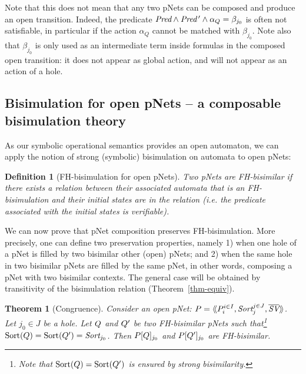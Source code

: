 \documentclass{lmcs}
\newcommand{\TODO}[1]{\textcolor{red}{\textbf{[TODO:#1]}}}
\newtheorem{theorem}{Theorem}
\newtheorem{definition}{Definition}
\begin{document}
Note that this does not mean that any two pNets can be composed and produce an open 
transition. Indeed, the predicate $\Pred\land\Pred\,'\land \alpha_Q=\beta_{j_0}$ is often not  satisfiable, in particular if the action  $\alpha_Q$ cannot be matched with $\beta_{j_0}$.
Note also that $\beta_{j_0}$ is  only used as an intermediate term inside formulas in the composed open transition: it 
does not appear as global action, and will not appear as an action of a hole.


\subsection{Bisimulation for open pNets -- a composable bisimulation theory}
\label{section:bisimulation-PN}
As  our symbolic operational semantics provides an open automaton, we can apply the notion of
	strong (symbolic) bisimulation on automata to open pNets:
\begin{definition}[FH-bisimulation for open pNets]\label{def:bisim-pnets}
Two pNets are FH-bisimilar if there exists a relation between their associated 
automata that is an FH-bisimulation and their initial states are in the relation (i.e. the predicate associated with the initial states is verifiable).
\end{definition}

We can now prove that pNet composition  preserves
FH-bisimulation. More precisely, one can define two preservation
properties, namely 1) when one hole of a pNet is filled by two bisimilar other (open) pNets; and 2) when the same hole in two bisimilar pNets are
filled by the same pNet, in other words, composing a pNet with two
bisimilar contexts. The general case will be obtained by
transitivity of the bisimulation relation (Theorem~\ref{thm-equiv}). 

\begin{theorem}[Congruence]\label{thm-congr-eq}
	Consider an open pNet:
	$\pNet = \mylangle \pNet_i^{i\in I}, \Sort_j^{j\in J}, 
	\set{\symb{SV}}\myrangle$.
	Let $j_0\in J$ be a hole. Let $Q$ and $Q'$ be two FH-bisimilar pNets such that\footnote{Note that $\operatorname{Sort}(Q)=\operatorname{Sort}(Q')$ is 
	ensured by 
	strong bisimilarity.} 
	$\Sortop(\pNetQ)=\Sortop(\pNetQ')=\Sort_{j_0}$. Then 
	$P[Q]_{j_0}$ and 
	$P[Q']_{j_0}$ are FH-bisimilar.
\end{theorem}
 
\end{document}
